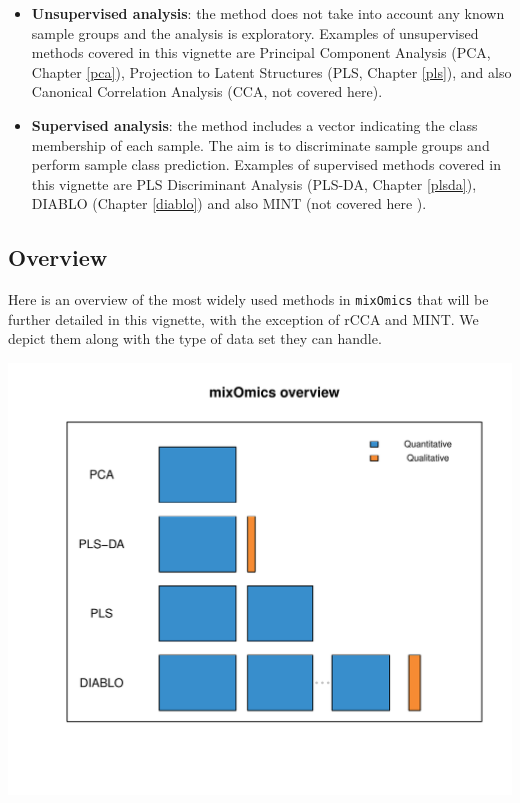 \documentclass[]{book}
\begin{document}
\begin{itemize}
\item
  \textbf{Unsupervised analysis}: the method does not take into account any known sample groups and the analysis is exploratory. Examples of unsupervised methods covered in this vignette are Principal Component Analysis (PCA, Chapter \ref{pca}), Projection to Latent Structures (PLS, Chapter \ref{pls}), and also Canonical Correlation Analysis (CCA, not covered here).
\item
  \textbf{Supervised analysis}: the method includes a vector indicating the class membership of each sample. The aim is to discriminate sample groups and perform sample class prediction. Examples of supervised methods covered in this vignette are PLS Discriminant Analysis (PLS-DA, Chapter \ref{plsda}), DIABLO (Chapter \ref{diablo}) and also MINT (not covered here \citep{Roh16}).
\end{itemize}

\hypertarget{intro:overview}{%
\subsection{Overview}\label{intro:overview}}

Here is an overview of the most widely used methods in \texttt{mixOmics} that will be further detailed in this vignette, with the exception of rCCA and MINT. We depict them along with the type of data set they can handle.

\begin{center}\includegraphics[width=0.5\linewidth,]{Figures/01-overview-1} \end{center}
\end{document}
